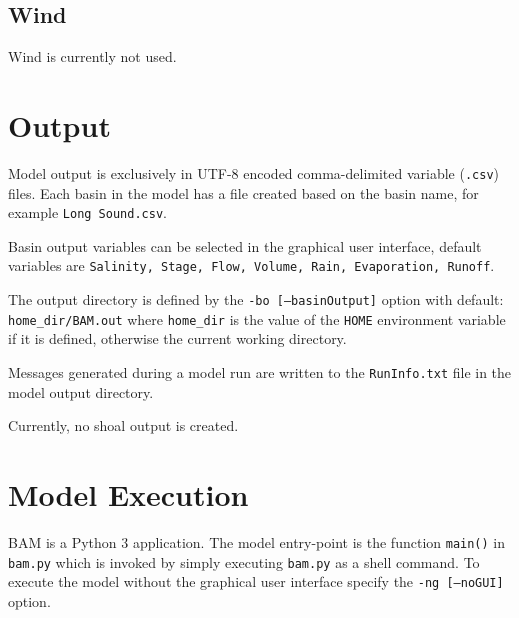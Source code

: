 \subsection{Wind}
\label{sec:Wind}
Wind is currently not used. 

\clearpage 
\section{Output}
\label{sec:Output}
Model output is exclusively in UTF-8 encoded comma-delimited variable (\texttt{.csv}) files.  Each basin in the model has a file created based on the basin name, for example \texttt{Long Sound.csv}. 

Basin output variables can be selected in the graphical user interface, default variables are \texttt{Salinity, Stage, Flow, Volume, Rain, Evaporation, Runoff}.

The output directory is defined by the \texttt{-bo [--basinOutput]} option with default: \texttt{home\_dir/BAM.out} where \texttt{home\_dir} is the value of the \texttt{HOME} environment variable if it is defined, otherwise the current working directory.

Messages generated during a model run are written to the \texttt{RunInfo.txt} file in the model output directory. 

Currently, no shoal output is created. 

\clearpage 
\section{Model Execution}
\label{sec:Model Execution}
BAM is a Python 3 application.  The model entry-point is the function \texttt{main()} in \texttt{bam.py} which is invoked by simply executing \texttt{bam.py} as a shell command.  To execute the model without the graphical user interface specify the \texttt{-ng [--noGUI]} option. 

